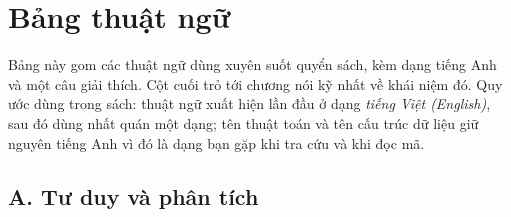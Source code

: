 \documentclass[algorithm.tex]{subfiles}
\begin{document}
\chapter*{Bảng thuật ngữ}

\begin{tomtat}
Bảng này gom các thuật ngữ dùng xuyên suốt quyển sách, kèm dạng tiếng Anh và một câu giải thích. Cột cuối trỏ tới chương nói kỹ nhất về khái niệm đó. Quy ước dùng trong sách: thuật ngữ xuất hiện lần đầu ở dạng \emph{tiếng Việt (English)}, sau đó dùng nhất quán một dạng; tên thuật toán và tên cấu trúc dữ liệu giữ nguyên tiếng Anh vì đó là dạng bạn gặp khi tra cứu và khi đọc mã.
\end{tomtat}

\section*{A. Tư duy và phân tích}
\end{document}
